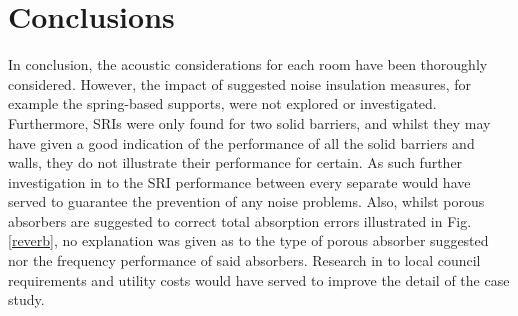 \documentclass[10pt, twocolumn]{article}
\begin{document}
    \section{Conclusions}
        In conclusion, the acoustic considerations for each room have been thoroughly considered.
        However, the impact of suggested noise insulation measures, for example the spring-based supports, were not explored or investigated.
        Furthermore, SRIs were only found for two solid barriers, and whilst they may have given a good indication of the performance of all the solid barriers and walls, they do not illustrate their performance for certain.
        As such further investigation in to the SRI performance between every separate would have served to guarantee the prevention of any noise problems.
        Also, whilst porous absorbers are suggested to correct total absorption errors illustrated in Fig.\ref{reverb}, no explanation was given as to the type of porous absorber suggested nor the frequency performance of said absorbers.
        Research in to local council requirements and utility costs would have served to improve the detail of the case study.

    
    
\end{document}
